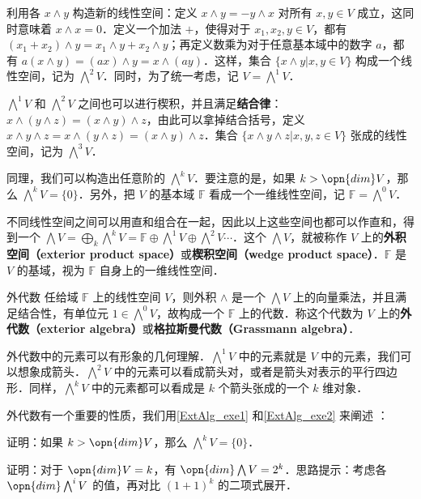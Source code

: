 利用各 $x\wedge y$ 构造新的线性空间：定义 $x\wedge y=-y\wedge x$ 对所有 $x, y\in V$ 成立，这同时意味着 $x\wedge x=0$．定义一个加法 $+$，使得对于 $x_1, x_2, y\in V$，都有 $(x_1+x_2)\wedge y=x_1\wedge y+x_2\wedge y$；再定义数乘为对于任意基本域中的数字 $a$，都有 $a(x\wedge y)=(ax)\wedge y=x\wedge(ay)$．这样，集合 $\{x\wedge y|x, y\in V\}$ 构成一个线性空间，记为 $\bigwedge^2 V$．同时，为了统一考虑，记 $V=\bigwedge^1 V$．

$\bigwedge^1 V$ 和 $\bigwedge^2 V$ 之间也可以进行楔积，并且满足\textbf{结合律}：$x\wedge(y\wedge z)=(x\wedge y)\wedge z$，由此可以拿掉结合括号，定义 $x\wedge y\wedge z=x\wedge(y\wedge z)=(x\wedge y)\wedge z$．集合 $\{x\wedge y\wedge z|x, y, z\in V\}$ 张成的线性空间，记为 $\bigwedge^3 V$．

同理，我们可以构造出任意阶的 $\bigwedge^k V$．要注意的是，如果 $k>\opn{dim} V$，那么 $\bigwedge^k V=\{0\}$．另外，把 $V$ 的基本域 $\mathbb{F}$ 看成一个一维线性空间，记 $\mathbb{F}=\bigwedge^0 V$．

不同线性空间之间可以用直和组合在一起，因此以上这些空间也都可以作直和，得到一个 $\bigwedge V=\bigoplus_k\bigwedge^k V=\mathbb{F}\oplus\bigwedge^1V\oplus\bigwedge^2V\cdots$．这个 $\bigwedge V$，就被称作 $V$ 上的\textbf{外积空间（exterior product space）}或\textbf{楔积空间（wedge product space）}．$\mathbb{F}$ 是 $V$ 的基域，视为 $\mathbb{F}$ 自身上的一维线性空间．

\begin{theorem}{外代数}
任给域 $\mathbb{F}$ 上的线性空间 $V$，则外积 $\wedge$ 是一个 $\bigwedge V$ 上的向量乘法，并且满足结合性，有单位元 $1\in \bigwedge^0 V$，故构成一个 $\mathbb{F}$ 上的代数．称这个代数为 $V$ 上的\textbf{外代数（exterior algebra）}或\textbf{格拉斯曼代数（Grassmann algebra）}．
\end{theorem}

外代数中的元素可以有形象的几何理解．$\bigwedge^1 V$ 中的元素就是 $V$ 中的元素，我们可以想象成箭头．$\bigwedge^2 V$ 中的元素可以看成箭头对，或者是箭头对表示的平行四边形．同样，$\bigwedge^k V$ 中的元素都可以看成是 $k$ 个箭头张成的一个 $k$ 维对象．

外代数有一个重要的性质，我们用\autoref{ExtAlg_exe1} 和\autoref{ExtAlg_exe2} 来阐述 ：

\begin{exercise}{}\label{ExtAlg_exe1}
证明：如果 $k>\opn{dim} V$，那么 $\bigwedge^kV=\{0\}$．
\end{exercise}

\begin{exercise}{}\label{ExtAlg_exe2}
证明：对于 $\opn{dim} V=k$，有 $\opn{dim} \bigwedge V=2^k$．思路提示：考虑各 $\opn{dim}\bigwedge^iV$ 的值，再对比 $(1+1)^k$ 的二项式展开．
\end{exercise}




